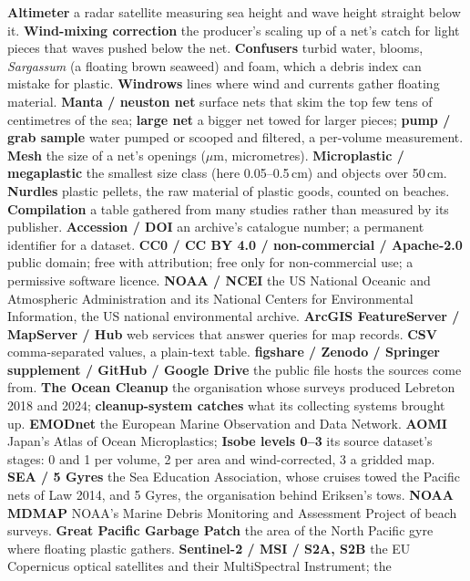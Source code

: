 \documentclass[10pt]{article}
\begin{document}
\textbf{Altimeter} a radar satellite measuring sea height and wave height straight below it. \textbf{Wind-mixing
correction} the producer's scaling up of a net's catch for light pieces that waves pushed below the net.
\textbf{Confusers} turbid water, blooms, \emph{Sargassum} (a floating brown seaweed) and foam, which a debris
index can mistake for plastic. \textbf{Windrows} lines where wind and currents gather floating material.
\textbf{Manta / neuston net} surface nets that skim the top few tens of centimetres of the sea; \textbf{large net}
a bigger net towed for larger pieces; \textbf{pump / grab sample} water pumped or scooped and filtered, a per-volume
measurement. \textbf{Mesh} the size of a net's openings ($\mu$m, micrometres). \textbf{Microplastic /
megaplastic} the smallest size class (here 0.05--0.5\,cm) and objects over 50\,cm. \textbf{Nurdles} plastic
pellets, the raw material of plastic goods, counted on beaches. \textbf{Compilation} a table gathered from many
studies rather than measured by its publisher. \textbf{Accession / DOI} an archive's catalogue number; a
permanent identifier for a dataset. \textbf{CC0 / CC BY 4.0 / non-commercial / Apache-2.0} public domain; free with
attribution; free only for non-commercial use; a permissive software licence. \textbf{NOAA / NCEI} the US National
Oceanic and Atmospheric Administration and its National Centers for Environmental Information, the US national
environmental archive. \textbf{ArcGIS FeatureServer / MapServer / Hub} web services that answer queries for map records.
\textbf{CSV} comma-separated values, a plain-text table. \textbf{figshare / Zenodo / Springer supplement / GitHub
/ Google Drive} the public file hosts the sources come from. \textbf{The Ocean Cleanup} the organisation whose surveys produced Lebreton 2018 and 2024;
\textbf{cleanup-system catches} what its collecting systems brought up. \textbf{EMODnet}
the European Marine Observation and Data Network. \textbf{AOMI} Japan's Atlas of Ocean Microplastics; \textbf{Isobe
levels 0--3} its source dataset's stages: 0 and 1 per volume, 2 per area and wind-corrected, 3 a gridded map. \textbf{SEA / 5 Gyres} the Sea Education
Association, whose cruises towed the Pacific nets of Law 2014, and 5 Gyres, the organisation behind Eriksen's
tows. \textbf{NOAA MDMAP} NOAA's Marine Debris Monitoring and Assessment Project of beach surveys.
\textbf{Great Pacific Garbage Patch} the area of the North Pacific gyre where floating plastic gathers.
\textbf{Sentinel-2 / MSI / S2A, S2B} the EU Copernicus optical satellites and their MultiSpectral Instrument; the
\end{document}
